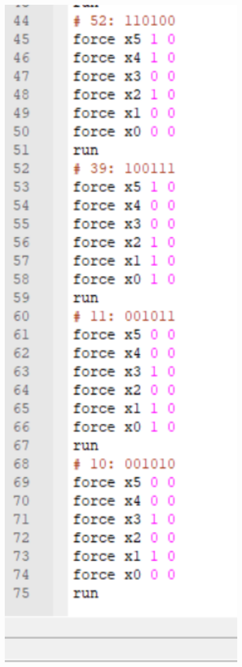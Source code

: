 \documentclass[]{article}
\begin{document}
\begin{minipage}{0.5\textwidth}
\begin{figure}[H]
	\centering
	\includegraphics[width=1\textwidth]{test_f3_2.png}
\end{figure}
\end{minipage}
\end{document}
